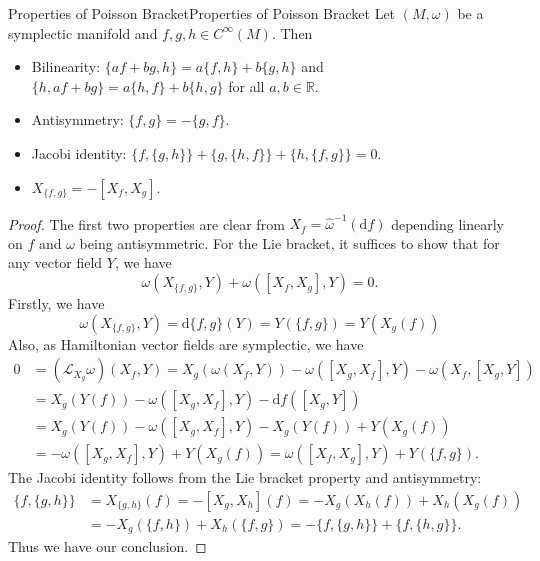 \documentclass[../main.tex]{subfiles}
\begin{document}
\begin{proposition}{Properties of Poisson Bracket}{Properties of Poisson Bracket}
  Let $(M, \omega)$ be a symplectic manifold and $f, g, h \in C^\infty(M)$. Then
  \begin{itemize}
    \item Bilinearity: $\{a f + b g, h\} = a \{f, h\} + b \{g, h\}$ and $\{h, a f + b g\} = a \{h, f\} + b \{h, g\}$ for all $a, b \in \mathbb{R}$.
    \item Antisymmetry: $\{f, g\} = -\{g, f\}$.
    \item Jacobi identity: $\{f, \{g, h\}\} + \{g, \{h, f\}\} + \{h, \{f, g\}\} = 0$.
    \item $X_{\{f, g\}} = -[X_f, X_g]$.
  \end{itemize}
\end{proposition}
\begin{proof}
  The first two properties are clear from $X_f = \hat{\omega}^{-1}(\mathrm{d} f)$ depending linearly on $f$ and $\omega$ being antisymmetric. For the Lie bracket, it suffices to show that for any vector field $Y$, we have
  \begin{equation*}
    \omega(X_{\{f, g\}}, Y) + \omega([X_f, X_g], Y) = 0.
  \end{equation*}
  Firstly, we have
  \begin{equation*}
    \omega(X_{\{f, g\}}, Y) = \mathrm{d} \{f, g\}(Y) = Y(\{f, g\}) = Y(X_g(f))
  \end{equation*}
  Also, as Hamiltonian vector fields are symplectic, we have
  \begin{equation*}
    \begin{aligned}
      0 &= (\mathcal{L}_{X_g} \omega)(X_f, Y) = X_g(\omega(X_f, Y)) - \omega([X_g, X_f], Y) - \omega(X_f, [X_g, Y]) \\
      &= X_g(Y(f)) - \omega([X_g, X_f], Y) -\mathrm{d} f([X_g, Y]) \\
      &= X_g(Y(f)) - \omega([X_g, X_f], Y) - X_g(Y(f)) + Y(X_g(f)) \\
      &= -\omega([X_g, X_f], Y) + Y(X_g(f)) = \omega([X_f, X_g], Y) + Y(\{f, g\}).
    \end{aligned}
  \end{equation*}
  The Jacobi identity follows from the Lie bracket property and antisymmetry:
  \begin{equation*}
    \begin{aligned}
      \{f, \{g, h\}\} &= X_{\{g, h\}}(f) = -[X_g, X_h](f) = -X_g(X_h(f)) + X_h(X_g(f)) \\
      &= -X_g(\{f, h\}) + X_h(\{f, g\}) = -\{f, \{g, h\}\} + \{f, \{h, g\}\}.
    \end{aligned}
  \end{equation*}
  Thus we have our conclusion.
\end{proof}
\end{document}
